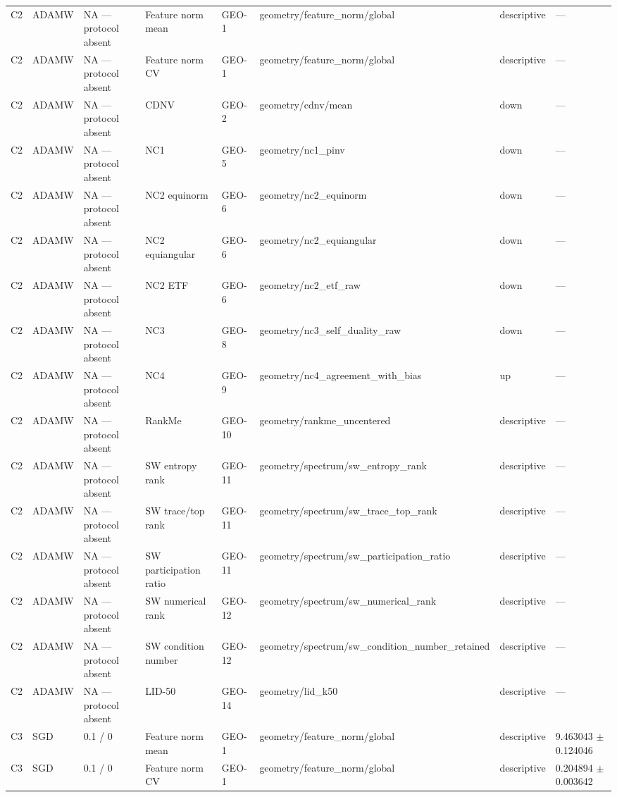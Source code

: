 \begin{longtable}{llllllll}
C2 & ADAMW & NA — protocol absent & Feature norm mean & GEO-1 & geometry/feature\_norm/global & descriptive & — \\
C2 & ADAMW & NA — protocol absent & Feature norm CV & GEO-1 & geometry/feature\_norm/global & descriptive & — \\
C2 & ADAMW & NA — protocol absent & CDNV & GEO-2 & geometry/cdnv/mean & down & — \\
C2 & ADAMW & NA — protocol absent & NC1 & GEO-5 & geometry/nc1\_pinv & down & — \\
C2 & ADAMW & NA — protocol absent & NC2 equinorm & GEO-6 & geometry/nc2\_equinorm & down & — \\
C2 & ADAMW & NA — protocol absent & NC2 equiangular & GEO-6 & geometry/nc2\_equiangular & down & — \\
C2 & ADAMW & NA — protocol absent & NC2 ETF & GEO-6 & geometry/nc2\_etf\_raw & down & — \\
C2 & ADAMW & NA — protocol absent & NC3 & GEO-8 & geometry/nc3\_self\_duality\_raw & down & — \\
C2 & ADAMW & NA — protocol absent & NC4 & GEO-9 & geometry/nc4\_agreement\_with\_bias & up & — \\
C2 & ADAMW & NA — protocol absent & RankMe & GEO-10 & geometry/rankme\_uncentered & descriptive & — \\
C2 & ADAMW & NA — protocol absent & SW entropy rank & GEO-11 & geometry/spectrum/sw\_entropy\_rank & descriptive & — \\
C2 & ADAMW & NA — protocol absent & SW trace/top rank & GEO-11 & geometry/spectrum/sw\_trace\_top\_rank & descriptive & — \\
C2 & ADAMW & NA — protocol absent & SW participation ratio & GEO-11 & geometry/spectrum/sw\_participation\_ratio & descriptive & — \\
C2 & ADAMW & NA — protocol absent & SW numerical rank & GEO-12 & geometry/spectrum/sw\_numerical\_rank & descriptive & — \\
C2 & ADAMW & NA — protocol absent & SW condition number & GEO-12 & geometry/spectrum/sw\_condition\_number\_retained & descriptive & — \\
C2 & ADAMW & NA — protocol absent & LID-50 & GEO-14 & geometry/lid\_k50 & descriptive & — \\
C3 & SGD & 0.1 / 0 & Feature norm mean & GEO-1 & geometry/feature\_norm/global & descriptive & 9.463043 $\pm$ 0.124046 \\
C3 & SGD & 0.1 / 0 & Feature norm CV & GEO-1 & geometry/feature\_norm/global & descriptive & 0.204894 $\pm$ 0.003642 \\

\end{longtable}
